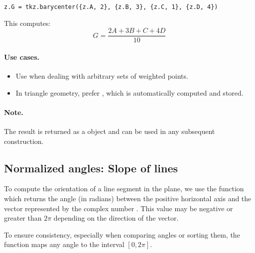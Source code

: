 \begin{mybox}
\begin{verbatim}
z.G = tkz.barycenter({z.A, 2}, {z.B, 3}, {z.C, 1}, {z.D, 4})
\end{verbatim}
\end{mybox}

This computes:
\[
G = \frac{2A + 3B + C + 4D}{10}
\]

\paragraph{Use cases.}
\begin{itemize}
  \item Use  when dealing with arbitrary sets of weighted points.
  \item In triangle geometry, prefer , which is automatically computed and stored.
\end{itemize}

\paragraph{Note.}
The result is returned as a  object and can be used in any subsequent construction.



\subsection{Normalized angles: Slope of lines} %
\label{sub:normalized_angles}

To compute the orientation of a line segment in the plane, we use the function  which returns the angle (in radians) between the positive horizontal axis and the vector represented by the complex number . This value may be negative or greater than $2\pi$ depending on the direction of the vector.

\medskip
To ensure consistency, especially when comparing angles or sorting them, the function  maps any angle to the interval $[0, 2\pi]$.

